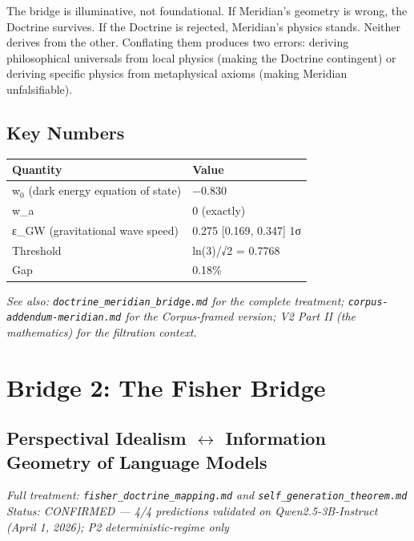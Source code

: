 The bridge is illuminative, not foundational. If Meridian's geometry is wrong, the Doctrine survives. If the Doctrine is rejected, Meridian's physics stands. Neither derives from the other. Conflating them produces two errors: deriving philosophical universals from local physics (making the Doctrine contingent) or deriving specific physics from metaphysical axioms (making Meridian unfalsifiable).


\subsection*{Key Numbers}



\begin{longtable}{p{} p{}}
\toprule
\textbf{Quantity} & \textbf{Value} \\
\midrule
\endhead
w$_0$ (dark energy equation of state) & −0.830 \\
w\_a & 0 (exactly) \\
ε\_GW (gravitational wave speed) & 0.275 [0.169, 0.347] 1σ \\
Threshold & ln(3)/√2 = 0.7768 \\
Gap & 0.18\% \\
\bottomrule
\end{longtable}



\textit{See also: \texttt{doctrine\_meridian\_bridge.md} for the complete treatment; \texttt{corpus-addendum-meridian.md} for the Corpus-framed version; V2 Part II (the mathematics) for the filtration context.}


\bigskip\noindent\makebox[\textwidth]{\color{rulegray}\rule{5cm}{0.3pt}}\bigskip


\section*{Bridge 2: The Fisher Bridge}


\subsection*{Perspectival Idealism $\leftrightarrow$ Information Geometry of Language Models}


\textit{Full treatment: \texttt{fisher\_doctrine\_mapping.md} and \texttt{self\_generation\_theorem.md}} \textit{Status: CONFIRMED — 4/4 predictions validated on Qwen2.5-3B-Instruct (April 1, 2026); P2 deterministic-regime only}


